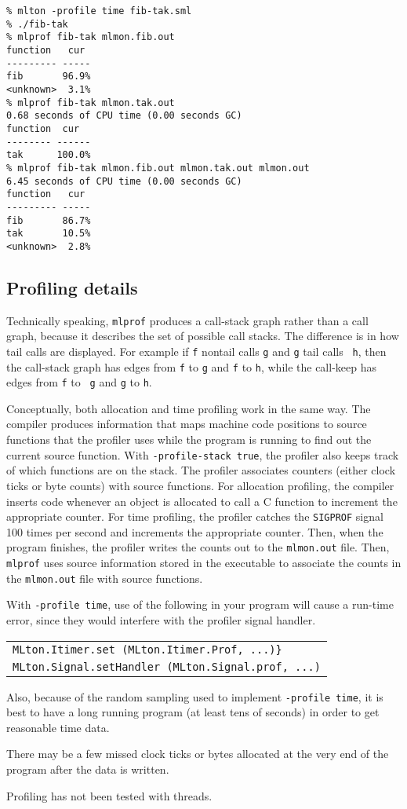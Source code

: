 \begin{verbatim}
% mlton -profile time fib-tak.sml
% ./fib-tak
% mlprof fib-tak mlmon.fib.out
function   cur 
--------- -----
fib       96.9%
<unknown>  3.1%
% mlprof fib-tak mlmon.tak.out
0.68 seconds of CPU time (0.00 seconds GC)
function  cur  
-------- ------
tak      100.0%
% mlprof fib-tak mlmon.fib.out mlmon.tak.out mlmon.out
6.45 seconds of CPU time (0.00 seconds GC)
function   cur 
--------- -----
fib       86.7%
tak       10.5%
<unknown>  2.8%
\end{verbatim}

\subsection{Profiling details}

Technically speaking, {\tt mlprof} produces a call-stack graph rather
than a call graph, because it describes the set of possible call
stacks.  The difference is in how tail calls are displayed.  For
example if {\tt f} nontail calls {\tt g} and {\tt g} tail calls {\tt
h}, then the call-stack graph has edges from {\tt f} to {\tt g} and
{\tt f} to {\tt h}, while the call-keep has edges from {\tt f} to {\tt
g} and {\tt g} to {\tt h}.

Conceptually, both allocation and time profiling work in the same way.
The compiler produces information that maps machine code positions to
source functions that the profiler uses while the program is running
to find out the current source function.  With {\tt -profile-stack
true}, the profiler also keeps track of which functions are on the
stack.  The profiler associates counters (either clock ticks or byte
counts) with source functions.  For allocation profiling, the compiler
inserts code whenever an object is allocated to call a C function to
increment the appropriate counter.  For time profiling, the profiler
catches the {\tt SIGPROF} signal 100 times per second and increments
the appropriate counter.  Then, when the program finishes, the
profiler writes the counts out to the {\tt mlmon.out} file.  Then,
{\tt mlprof} uses source information stored in the executable to
associate the counts in the {\tt mlmon.out} file with source
functions.

With {\tt -profile time}, use of the following in your program will
cause a run-time error, since they would interfere with the profiler
signal handler.\\
\begin{tabular}{l}
\tt MLton.Itimer.set (MLton.Itimer.Prof, ...)\}\\
\tt MLton.Signal.setHandler (MLton.Signal.prof, ...)
\end{tabular}
Also, because of the random sampling used to implement {\tt -profile
time}, it is best to have a long running program (at least tens of
seconds) in order to get reasonable time data.

There may be a few missed clock ticks or bytes allocated at the
very end of the program after the data is written.

Profiling has not been tested with threads.
